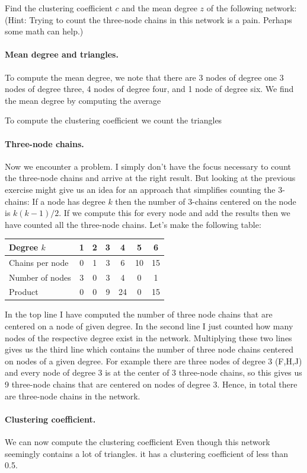 
Find the clustering coefficient $c$ and the mean degree $z$ of the following network:
(Hint: Trying to count the three-node chains in this network is a pain. Perhaps some math can help.)

\solution
\paragraph{Mean degree and triangles.} To compute the mean degree, we note that there are 3 nodes of degree one 3 nodes of degree three, 4 nodes of degree four, and 1 node of degree six. We find the mean degree by computing the average

To compute the clustering coefficient we count the triangles
\paragraph{Three-node chains.}Now we encounter a problem. I simply don't have the focus necessary to count the three-node chains and arrive at the right result. But looking at the previous exercise might give us an idea for an approach that simplifies counting the 3-chains: If a node has degree $k$ then the number of 3-chains centered on the node is $k(k-1)/2$. If we compute this for every node and add the results then we have counted all the three-node chains. Let's make the following table: 
\begin{center}
\begin{tabular}{l | c  c  c  c  c  c}
Degree $k$ & 1 & 2 & 3 & 4 & 5 & 6 \\\hline
Chains per node & 0 & 1 & 3 & 6 & 10 & 15 \\
Number of nodes & 3 & 0 & 3 & 4 & 0 & 1  \\
Product         & 0 & 0 & 9 & 24 & 0 & 15 
\end{tabular}    
\end{center}
In the top line I have computed the number of three node chains that are centered on a node of given degree. In the second line I just counted how many nodes of the respective degree exist in the network. Multiplying these two lines gives us the third line which contains the number of three node chains centered on nodes of a given degree. 
For example there are three nodes of degree 3 (F,H,J) and every node of degree 3 is at the center of 3 three-node chains, so this gives us 9 three-node chains that are centered on nodes of degree 3. Hence, in total there are 
three-node chains in the network. 
\paragraph{Clustering coefficient.}We can now compute the clustering coefficient 
Even though this network seemingly contains a lot of triangles. it has a clustering coefficient of less than 0.5. 
